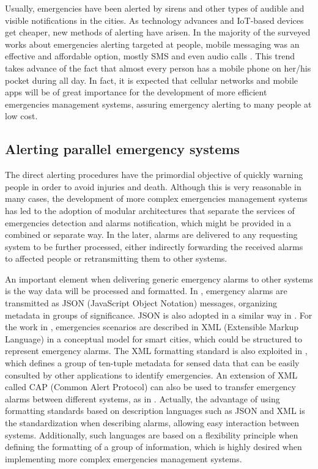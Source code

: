 \begin{refsection}
Usually, emergencies have been alerted by sirens and other types of audible and visible notifications in the cities. As technology advances and IoT-based devices get cheaper, new methods of alerting have arisen. In the majority of the surveyed works about emergencies alerting targeted at people, mobile messaging was an effective and affordable option, mostly SMS \cite{notification2,notification1,notification4,notification5, notification6} and even audio calls \cite{notification5}. This trend takes advance of the fact that almost every person has a mobile phone on her/his pocket during all day. In fact, it is expected that cellular networks and mobile apps will be of great importance for the development of more efficient emergencies management systems, assuring emergency alerting to many people at low cost. 

\subsection{Alerting parallel emergency systems}

The direct alerting procedures have the primordial objective of quickly warning people in order to avoid injuries and death. Although this is very reasonable in many cases, the development of more complex emergencies management systems has led to the adoption of modular architectures that separate the services of emergencies detection and alarms notification, which might be provided in a combined or separate way. In the later, alarms are delivered to any requesting system to be further processed, either indirectly forwarding the received alarms to affected people or retransmitting them to other systems.

An important element when delivering generic emergency alarms to other systems is the way data will be processed and formatted. In \cite{emergenciesmetric2,emergenciesmetric3}, emergency alarms are transmitted as JSON (JavaScript Object Notation) messages, organizing metadata in groups of significance. JSON is also adopted in a similar way in \cite{emergenciesmetric5}. For the work in \cite{emergenciesxml}, emergencies scenarios are described in XML (Extensible Markup Language) in a conceptual model for smart cities, which could be structured to represent emergency alarms. The XML formatting standard is also exploited in \cite{emergenciesxml2}, which defines a group of ten-tuple metadata for sensed data that can be easily consulted by other applications to identify emergencies. An extension of XML called CAP (Common Alert Protocol) can also be used to transfer emergency alarms between different systems, as in \cite{notification1}. Actually, the advantage of using formatting standards based on description languages such as JSON and XML is the standardization when describing alarms, allowing easy interaction between systems. Additionally, such languages are based on a flexibility principle when defining the formatting of a group of information, which is highly desired when implementing more complex emergencies management systems.


\end{refsection}
